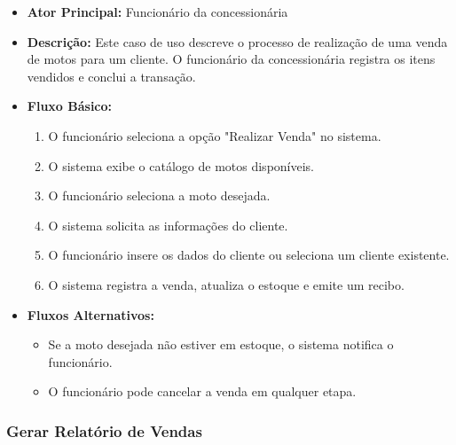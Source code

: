 \begin{itemize}
	\item \textbf{Ator Principal:} Funcionário da concessionária
	\item \textbf{Descrição:} Este caso de uso descreve o processo de realização de uma venda de motos para um cliente. O funcionário da concessionária registra os itens vendidos e conclui a transação.
	\item \textbf{Fluxo Básico:}
	\begin{enumerate}
		\item O funcionário seleciona a opção "Realizar Venda" no sistema.
		\item O sistema exibe o catálogo de motos disponíveis.
		\item O funcionário seleciona a moto desejada.
		\item O sistema solicita as informações do cliente.
		\item O funcionário insere os dados do cliente ou seleciona um cliente existente.
		\item O sistema registra a venda, atualiza o estoque e emite um recibo.
	\end{enumerate}
	\item \textbf{Fluxos Alternativos:}
	\begin{itemize}
		\item Se a moto desejada não estiver em estoque, o sistema notifica o funcionário.
		\item O funcionário pode cancelar a venda em qualquer etapa.
	\end{itemize}
\end{itemize}

\subsubsection{Gerar Relatório de Vendas}


